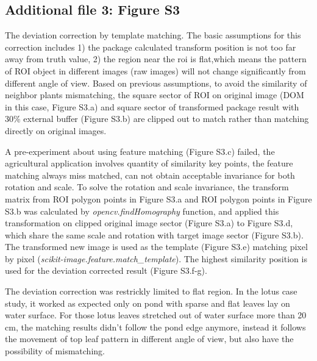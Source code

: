 \documentclass{configs/bmcart}
\begin{document}
\begin{backmatter}
\subsection*{Additional file 3: Figure S3}
The deviation correction by template matching. The basic assumptions for this correction includes 1) the package calculated transform position is not too far away from truth value, 2) the region near the \acrfull*{roi} is flat,which means the pattern of ROI object in different images (raw images) will not change significantly from different angle of view. Based on previous assumptions, to avoid the similarity of neighbor plants mismatching, the square sector of ROI on original image (DOM in this case, Figure S3.a) and square sector of transformed package result with 30\% external buffer (Figure S3.b) are clipped out to match rather than matching directly on original images. 

A pre-experiment about using feature matching (Figure S3.c) failed, the agricultural application involves quantity of similarity key points, the feature matching always miss matched, can not obtain acceptable invariance for both rotation and scale. To solve the rotation and scale invariance, the transform matrix from ROI polygon points in Figure S3.a and ROI polygon points in Figure S3.b was calculated by \textit{opencv.findHomography} function, and applied this transformation on clipped original image sector (Figure S3.a) to Figure S3.d, which share the same scale and rotation with target image sector (Figure S3.b). The transformed new image is used as the template (Figure S3.e) matching pixel by pixel (\textit{scikit-image.feature.match\_template}). The highest similarity position is used for the deviation corrected result (Figure S3.f-g).

The deviation correction was restrickly limited to flat region. In the lotus case study, it worked as expected only on pond with sparse and flat leaves lay on water surface. For those lotus leaves stretched out of water surface more than 20 cm, the matching results didn't follow the pond edge anymore, instead it follows the movement of top leaf pattern in different angle of view, but also have the possibility of mismatching.




\end{backmatter}
\end{document}
